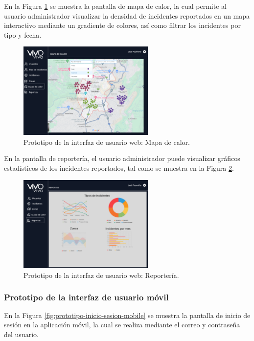 En la Figura \ref{fig:prototipo-mapa-de-calor-web} se muestra la pantalla de mapa de calor, la cual permite al usuario administrador visualizar
la densidad de incidentes reportados en un mapa interactivo mediante un gradiente de colores, así como filtrar los incidentes por tipo y fecha.

\begin{figure}[H]
    \centering
    \includegraphics[width=0.6\textwidth]{chapters/III-resultados-y-discusion/resources/images/prototipo-mapa-de-calor-web.png}
    \caption{Prototipo de la interfaz de usuario web: Mapa de calor.}
    \label{fig:prototipo-mapa-de-calor-web}
\end{figure}

En la pantalla de reportería, el usuario administrador puede visualizar gráficos estadísticos de los incidentes reportados, tal como se muestra
en la Figura \ref{fig:prototipo-reporteria-web}.

\begin{figure}[H]
    \centering
    \includegraphics[width=0.6\textwidth]{chapters/III-resultados-y-discusion/resources/images/prototipo-reporteria-web.png}
    \caption{Prototipo de la interfaz de usuario web: Reportería.}
    \label{fig:prototipo-reporteria-web}
\end{figure}

\subsubsection{Prototipo de la interfaz de usuario móvil}
En la Figura \ref{fig:prototipo-inicio-sesion-mobile} se muestra la pantalla de inicio de sesión en la aplicación móvil, la cual se realiza mediante
el correo y contraseña del usuario.

